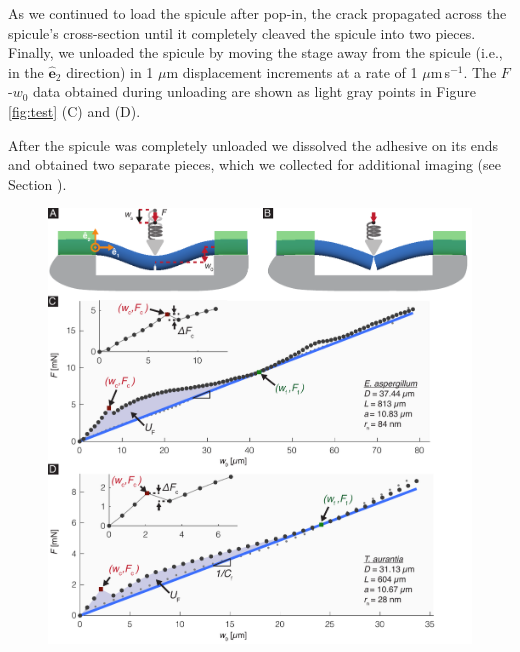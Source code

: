 \documentclass[12pt,onecolumn]{article}
\makeatletter
\DeclareRobustCommand*{\nameref}[1]{%
      \emph{\myorg@nameref{#1}}%
    }%
\newcommand{\ey}{\hat{\mathbf{e}}_2}
\makeatother
\begin{document}
As we continued to load the spicule after pop-in, the crack propagated across the spicule's cross-section until it completely cleaved the spicule into two pieces. Finally, we unloaded the spicule by moving the stage away from the spicule (i.e., in the $\ey$ direction) in 1 $\mu$m displacement increments at a rate of 1 $\mu$m\,s$^{-1}$. The $F$-$w_0$ data obtained during unloading are shown as light gray points in Figure \ref{fig:test} (C) and (D).

After the spicule was completely unloaded we dissolved the adhesive on its ends and obtained two separate pieces, which we collected for additional imaging (see Section \nameref{sec:fracto}).
%
			\begin{figure}[ht!]
			\centering
			\includegraphics[width=\textwidth]{../Figures/FigureTest/Figure4_V7A.pdf}

\end{figure}
\end{document}
